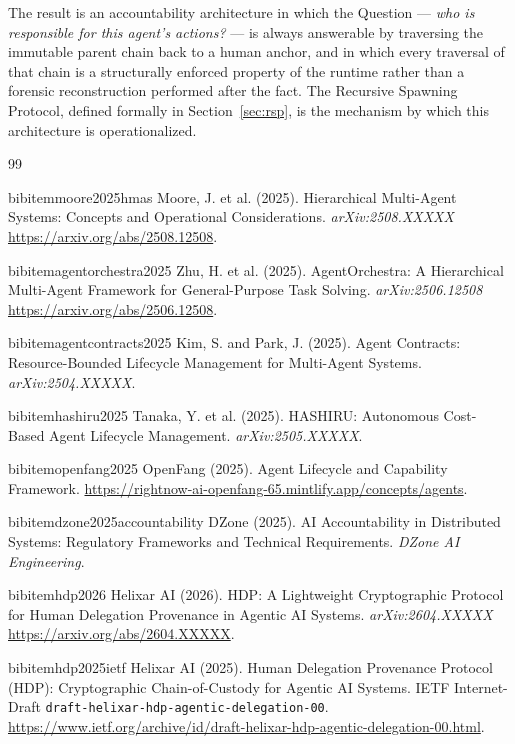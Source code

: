 The result is an accountability architecture in which the Question --- \emph{who is responsible for this agent's actions?} --- is always answerable by traversing the immutable parent chain back to a human anchor, and in which every traversal of that chain is a structurally enforced property of the runtime rather than a forensic reconstruction performed after the fact. The Recursive Spawning Protocol, defined formally in Section~\ref{sec:rsp}, is the mechanism by which this architecture is operationalized.

\begin{thebibliography}{99}

bibitem{moore2025hmas}
Moore, J. et al. (2025). Hierarchical Multi-Agent Systems: Concepts and Operational Considerations. \textit{arXiv:2508.XXXXX} \url{https://arxiv.org/abs/2508.12508}.

bibitem{agentorchestra2025}
Zhu, H. et al. (2025). AgentOrchestra: A Hierarchical Multi-Agent Framework for General-Purpose Task Solving. \textit{arXiv:2506.12508} \url{https://arxiv.org/abs/2506.12508}.

bibitem{agentcontracts2025}
Kim, S. and Park, J. (2025). Agent Contracts: Resource-Bounded Lifecycle Management for Multi-Agent Systems. \textit{arXiv:2504.XXXXX}.

bibitem{hashiru2025}
Tanaka, Y. et al. (2025). HASHIRU: Autonomous Cost-Based Agent Lifecycle Management. \textit{arXiv:2505.XXXXX}.

bibitem{openfang2025}
OpenFang (2025). Agent Lifecycle and Capability Framework. \url{https://rightnow-ai-openfang-65.mintlify.app/concepts/agents}.

bibitem{dzone2025accountability}
DZone (2025). AI Accountability in Distributed Systems: Regulatory Frameworks and Technical Requirements. \textit{DZone AI Engineering}.

bibitem{hdp2026}
Helixar AI (2026). HDP: A Lightweight Cryptographic Protocol for Human Delegation Provenance in Agentic AI Systems. \textit{arXiv:2604.XXXXX} \url{https://arxiv.org/abs/2604.XXXXX}.

bibitem{hdp2025ietf}
Helixar AI (2025). Human Delegation Provenance Protocol (HDP): Cryptographic Chain-of-Custody for Agentic AI Systems. IETF Internet-Draft \texttt{draft-helixar-hdp-agentic-delegation-00}. \url{https://www.ietf.org/archive/id/draft-helixar-hdp-agentic-delegation-00.html}.


\end{thebibliography}
